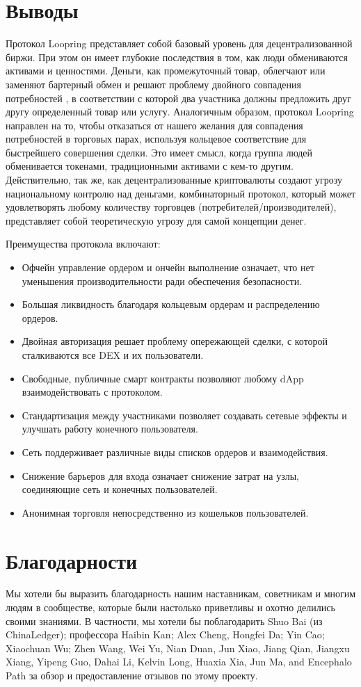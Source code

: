\documentclass[utf8,nofonts]{article}
\begin{document}
\begin{multicols}{2}
			\section{Выводы}
			Протокол Loopring представляет собой базовый уровень для децентрализованной биржи. При этом он имеет глубокие последствия в том, как люди обмениваются активами и ценностями. Деньги, как промежуточный товар, облегчают или заменяют бартерный обмен и решают проблему двойного совпадения потребностей \cite{unenumerated2006}, в соответствии с которой два участника должны предложить друг другу определенный товар или услугу. Аналогичным образом, протокол Loopring направлен на то, чтобы отказаться от нашего желания для совпадения потребностей в торговых парах, используя кольцевое соответствие для быстрейшего совершения сделки. Это имеет смысл, когда группа людей обменивается токенами, традиционными активами с кем-то другим. Действительно, так же, как децентрализованные криптовалюты создают угрозу национальному контролю над деньгами, комбинаторный протокол, который может удовлетворять любому количеству торговцев (потребителей/производителей), представляет собой теоретическую угрозу для самой концепции денег.
			
			Преимущества протокола включают:
			\begin{itemize}
			\item Офчейн управление ордером и ончейн выполнение означает, что нет уменьшения производительности ради обеспечения безопасности.
			\item Большая ликвидность благодаря кольцевым ордерам и распределению ордеров.
			\item Двойная авторизация решает проблему опережающей сделки, с которой сталкиваются все DEX и их пользователи.
			\item Свободные, публичные смарт контракты позволяют любому dApp взаимодействовать с протоколом.
			\item Стандартизация между участниками позволяет создавать сетевые эффекты и улучшать работу конечного пользователя.
			\item Сеть поддерживает различные виды списков ордеров и взаимодействия.
			\item Снижение барьеров для входа означает снижение затрат на узлы, соединяющие сеть и конечных пользователей.
			\item Анонимная торговля непосредственно из кошельков пользователей.
			\end{itemize}
			\section{Благодарности}
			Мы хотели бы выразить благодарность нашим наставникам, советникам и многим людям в сообществе, которые были настолько приветливы и охотно делились своими знаниями. В частности, мы хотели бы поблагодарить Shuo Bai (из ChinaLedger); профессора Haibin Kan; Alex Cheng, Hongfei Da; Yin Cao; Xiaochuan Wu; Zhen Wang, Wei Yu, Nian Duan, Jun Xiao, Jiang Qian, Jiangxu Xiang, Yipeng Guo, Dahai Li, Kelvin Long, Huaxia Xia, Jun Ma, and Encephalo Path за обзор и предоставление отзывов по этому проекту. 
			
			
			\end{multicols}
\end{document}
